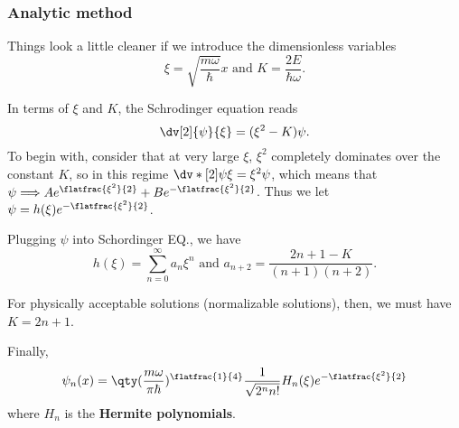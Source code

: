\subsubsection{Analytic method}
Things look a little cleaner if we introduce the dimensionless variables
\[
	\xi=\sqrt{\frac{m\omega}{\hbar}}x\mbox{ and }K=\frac{2E}{\hbar\omega}
	.\]

In terms of $\xi$ and  $K$, the Schrodinger equation reads
\[
	\dv[2]{\psi}{\xi}=(\xi^2-K)\psi
	.\]
To begin with, consider that at very large $\xi$, $\xi^2$ completely dominates over the constant $K$, so in this regime $\dv*[2]{\psi}{\xi}=\xi^2\psi$, which means that $\psi\Longrightarrow Ae^{\flatfrac{\xi^2}{2}}+Be^{-\flatfrac{\xi^2}{2}}$.
Thus we let $\psi=h(\xi)e^{-\flatfrac{\xi^2}{2}}$.

Plugging $\psi$ into Schordinger EQ., we have
\[
	h(\xi)=\sum_{n=0}^\infty a_n\xi^n\mbox{ and }a_{n+2}=\frac{2n+1-K}{(n+1)(n+2)}
	.\]

For physically acceptable solutions (normalizable solutions), then, we must have $K=2n+1$.

Finally,
\[
	\psi_n(x)=
	\qty(\frac{m\omega}{\pi\hbar})^{\flatfrac{1}{4}}
	\frac{1}{\sqrt{2^nn!}}H_n(\xi)e^{-\flatfrac{\xi^2}{2}}
\] where $H_n$ is the \textbf{Hermite polynomials}.

